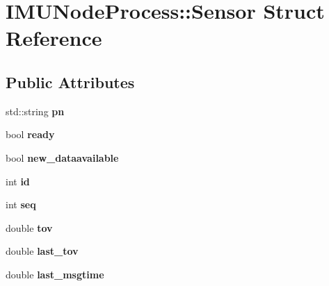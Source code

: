 \hypertarget{structIMUNodeProcess_1_1Sensor}{}\section{I\+M\+U\+Node\+Process\+:\+:Sensor Struct Reference}
\label{structIMUNodeProcess_1_1Sensor}
\subsection*{Public Attributes}
\begin{DoxyCompactItemize}
\item 
\mbox{\label{structIMUNodeProcess_1_1Sensor_a96f9e9928562ff60d0143866bba4dd70}} 
std\+::string {\bfseries pn}
\item 
\mbox{\label{structIMUNodeProcess_1_1Sensor_acf941fedbb913234926e92c6ac8a45db}} 
bool {\bfseries ready}
\item 
\mbox{\label{structIMUNodeProcess_1_1Sensor_af8a35a840fbf1a6bd0462173a0eb95ef}} 
bool {\bfseries new\+\_\+dataavailable}
\item 
\mbox{\label{structIMUNodeProcess_1_1Sensor_a862b1038876260444f487f5e95492ac1}} 
int {\bfseries id}
\item 
\mbox{\label{structIMUNodeProcess_1_1Sensor_a2c833044cd466b346188a2899cf4cc88}} 
int {\bfseries seq}
\item 
\mbox{\label{structIMUNodeProcess_1_1Sensor_a3f1897fe6d2f433caac5f5a11f475632}} 
double {\bfseries tov}
\item 
\mbox{\label{structIMUNodeProcess_1_1Sensor_a6a8375359ae99d140f3c28456260aeb6}} 
double {\bfseries last\+\_\+tov}
\item 
\mbox{\label{structIMUNodeProcess_1_1Sensor_afb18212ad03e94376972678b9275428e}} 
double {\bfseries last\+\_\+msgtime}
\item 
\mbox{\label{structIMUNodeProcess_1_1Sensor_acc1ace2840091abeb2166d942796bcdb}} 

\end{DoxyCompactItemize}
